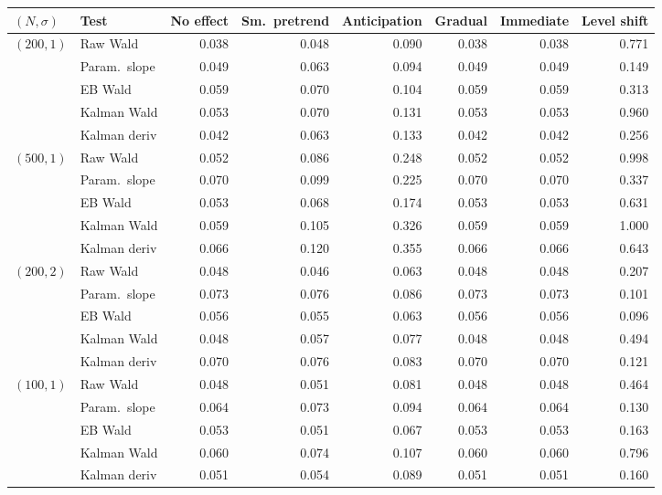 \begin{tabular}{l l rrrrrr}
\toprule
$(N, \sigma)$ & Test & No effect & Sm.\ pretrend & Anticipation & Gradual & Immediate & Level shift \\
\midrule
$(200, 1)$ & Raw Wald & 0.038 & 0.048 & 0.090 & 0.038 & 0.038 & 0.771 \\
 & Param.\ slope & 0.049 & 0.063 & 0.094 & 0.049 & 0.049 & 0.149 \\
 & EB Wald & 0.059 & 0.070 & 0.104 & 0.059 & 0.059 & 0.313 \\
 & Kalman Wald & 0.053 & 0.070 & 0.131 & 0.053 & 0.053 & 0.960 \\
 & Kalman deriv & 0.042 & 0.063 & 0.133 & 0.042 & 0.042 & 0.256 \\
\midrule
$(500, 1)$ & Raw Wald & 0.052 & 0.086 & 0.248 & 0.052 & 0.052 & 0.998 \\
 & Param.\ slope & 0.070 & 0.099 & 0.225 & 0.070 & 0.070 & 0.337 \\
 & EB Wald & 0.053 & 0.068 & 0.174 & 0.053 & 0.053 & 0.631 \\
 & Kalman Wald & 0.059 & 0.105 & 0.326 & 0.059 & 0.059 & 1.000 \\
 & Kalman deriv & 0.066 & 0.120 & 0.355 & 0.066 & 0.066 & 0.643 \\
\midrule
$(200, 2)$ & Raw Wald & 0.048 & 0.046 & 0.063 & 0.048 & 0.048 & 0.207 \\
 & Param.\ slope & 0.073 & 0.076 & 0.086 & 0.073 & 0.073 & 0.101 \\
 & EB Wald & 0.056 & 0.055 & 0.063 & 0.056 & 0.056 & 0.096 \\
 & Kalman Wald & 0.048 & 0.057 & 0.077 & 0.048 & 0.048 & 0.494 \\
 & Kalman deriv & 0.070 & 0.076 & 0.083 & 0.070 & 0.070 & 0.121 \\
\midrule
$(100, 1)$ & Raw Wald & 0.048 & 0.051 & 0.081 & 0.048 & 0.048 & 0.464 \\
 & Param.\ slope & 0.064 & 0.073 & 0.094 & 0.064 & 0.064 & 0.130 \\
 & EB Wald & 0.053 & 0.051 & 0.067 & 0.053 & 0.053 & 0.163 \\
 & Kalman Wald & 0.060 & 0.074 & 0.107 & 0.060 & 0.060 & 0.796 \\
 & Kalman deriv & 0.051 & 0.054 & 0.089 & 0.051 & 0.051 & 0.160 \\
\bottomrule
\end{tabular}
